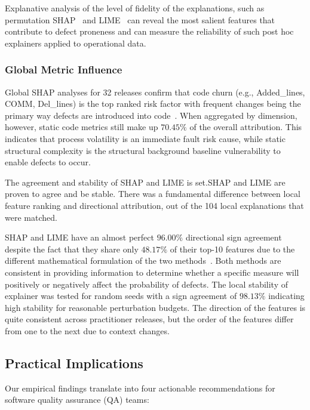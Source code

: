 \documentclass[conference]{IEEEtran}
\begin{document}
Explanative analysis of the level of fidelity of the explanations, such as permutation SHAP~\cite{lundberg2017shap} and LIME~\cite{ribeiro2016lime} can reveal the most salient features that contribute to defect proneness and can measure the reliability of such post hoc explainers applied to operational data.

\subsubsection{Global Metric Influence}
Global SHAP analyses for 32 releases confirm that code churn (e.g., Added\_lines, COMM, Del\_lines) is the top ranked risk factor with frequent changes being the primary way defects are introduced into code~\cite{yatish2019affected}. When aggregated by dimension, however, static code metrics still make up $70.45\%$ of the overall attribution. This indicates that process volatility is an immediate fault risk cause, while static structural complexity is the structural background baseline vulnerability to enable defects to occur.

The agreement and stability of SHAP and LIME is set.SHAP and LIME are proven to agree and be stable.
There was a fundamental difference between local feature ranking and directional attribution, out of the 104 local explanations that were matched.
\begin{enumerate}
    SHAP and LIME have an almost perfect $96.00\%$ directional sign agreement despite the fact that they share only $48.17\%$ of their top-10 features due to the different mathematical formulation of the two methods~\cite{lundberg2017shap, ribeiro2016lime}. Both methods are consistent in providing information to determine whether a specific measure will positively or negatively affect the probability of defects.
    The local stability of explainer was tested for random seeds with a sign agreement of $98.13\%$ indicating high stability for reasonable perturbation budgets. The direction of the features is quite consistent across practitioner releases, but the order of the features differ from one to the next due to context changes.
\end{enumerate}


\subsection{Practical Implications}
\label{subsec:practical-implications}

Our empirical findings translate into four actionable recommendations for software quality assurance (QA) teams:
\end{document}

